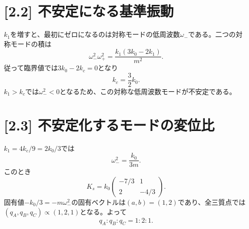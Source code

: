 \documentclass[11pt,a4paper]{article}
\begin{document}
\section*{[2.2] 不安定になる基準振動}
$k_1$を増すと、最初にゼロになるのは対称モードの低周波数$\omega_-$である。二つの対称モードの積は
\begin{equation}
  \omega_-^2\omega_+^2=\frac{k_1(3k_0-2k_1)}{m^2}.
\end{equation}
従って臨界値では$3k_0-2k_c=0$となり
\begin{equation}
  \boxed{k_c=\frac32 k_0}.
\end{equation}
$k_1>k_c$では$\omega_-^2<0$となるため、この対称な低周波数モードが不安定である。

\section*{[2.3] 不安定化するモードの変位比}
$k_1=4k_c/9=2k_0/3$では
\begin{equation}
  \omega_-^2=\frac{k_0}{3m}.
\end{equation}
このとき
\begin{equation}
  K_s=k_0\begin{pmatrix}-7/3&1\\2&-4/3\end{pmatrix}.
\end{equation}
固有値$-k_0/3=-m\omega_-^2$の固有ベクトルは$(a,b)=(1,2)$であり、全三質点では$(q_A,q_B,q_C)\propto(1,2,1)$となる。よって
\begin{equation}
  \boxed{q_A:q_B:q_C=1:2:1}.
\end{equation}
\end{document}

